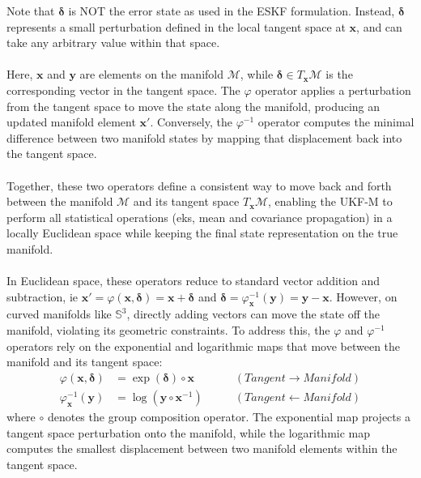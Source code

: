 Note that $\boldsymbol{\delta}$ is NOT the error state as used in the ESKF formulation. Instead, $\boldsymbol{\delta}$ represents a small perturbation defined in the local tangent space at $\mathbf{x}$, and can take any arbitrary value within that space.  
\\ \\
Here, $\mathbf{x}$ and $\mathbf{y}$ are elements on the manifold $\mathcal{M}$, while $\boldsymbol{\delta} \in T_\mathbf{x}\mathcal{M}$ is the corresponding vector in the tangent space. The $\varphi$ operator applies a perturbation from the tangent space to move the state along the manifold, producing an updated manifold element $\mathbf{x}'$. Conversely, the $\varphi^{-1}$ operator computes the minimal difference between two manifold states by mapping that displacement back into the tangent space.  
\\ \\
Together, these two operators define a consistent way to move back and forth between the manifold $\mathcal{M}$ and its tangent space $T_\mathbf{x}\mathcal{M}$, enabling the UKF-M to perform all statistical operations (eks, mean and covariance propagation) in a locally Euclidean space while keeping the final state representation on the true manifold.  
\\ \\
In Euclidean space, these operators reduce to standard vector addition and subtraction, ie $\mathbf{x}' = \varphi(\mathbf{x}, \boldsymbol{\delta}) = \mathbf{x} + \boldsymbol{\delta}$ and $\boldsymbol{\delta} = \varphi^{-1}_{\mathbf{x}}(\mathbf{y}) = \mathbf{y} - \mathbf{x}$. However, on curved manifolds like $\mathbb{S}^3$, directly adding vectors can move the state off the manifold, violating its geometric constraints. To address this, the $\varphi$ and $\varphi^{-1}$ operators rely on the exponential and logarithmic maps that move between the manifold and its tangent space:
$$
\begin{aligned}
    \varphi(\mathbf{x}, \boldsymbol{\delta}) &= \exp(\boldsymbol{\delta}) \circ \mathbf{x} &\qquad (Tangent \rightarrow Manifold) \\
    \varphi^{-1}_{\mathbf{x}}(\mathbf{y}) &= \log(\mathbf{y} \circ \mathbf{x}^{-1}) &\qquad (Tangent \leftarrow Manifold)
\end{aligned}
$$
where $\circ$ denotes the group composition operator. The exponential map projects a tangent space perturbation onto the manifold, while the logarithmic map computes the smallest displacement between two manifold elements within the tangent space.  
